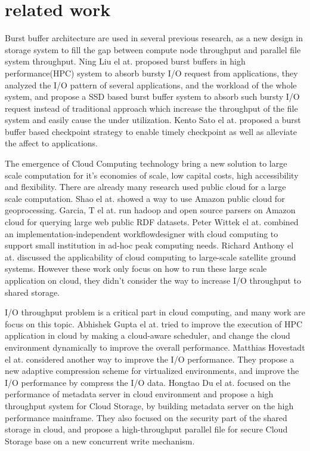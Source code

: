 \section{related work}
\label{sec:related work}

Burst buffer architecture are used in several previous research, as a new design in storage system
to fill the gap between compute node throughput and parallel file system throughput.
Ning Liu el at. \cite{on_the_role_of_burst_buffers} proposed burst buffers in high
performance(HPC) system to absorb bursty I/O request from applications, they analyzed the I/O
pattern of several applications, and the workload of the whole system, and propose a SSD based burst
buffer system to absorb such bursty I/O request instead of traditional approach which increase the
throughput of the file system and easily cause the under utilization.
Kento Sato el at.\cite{checkpointing} proposed a burst buffer based checkpoint strategy to enable
timely checkpoint as well as alleviate the affect to applications.

The emergence of Cloud Computing technology bring a new solution to large scale computation for it's
economies of scale, low capital costs, high accessibility and flexibility.
There are already many research used public cloud for a large scale computation.
Shao el at.\cite{Geoprocessing_on_the_Amazon_cloud_computing_platform} showed a way to use Amazon
public cloud for geoprocessing.
Garcia, T el at.\cite{Analysis_of_Big_Data_Technologies_and_Method} run hadoop and open source
parsers on Amazon cloud for querying large web public RDF datasets.
Peter Wittek el at.\cite{XML_Processing_in_the_Cloud} combined an implementation-independent
workflowdesigner with cloud computing to support small institution in ad-hoc peak computing needs.
Richard Anthony el at.\cite{Cloud_computing_applications_for_large-scale_satellite_ground_systems}
discussed the applicability of cloud computing to large-scale satellite ground 
systems.
However these work only focus on how to run these large scale application on cloud, they didn't
consider the way to increase I/O throughput to shared storage.

I/O throughput problem is a critical part in cloud computing, and many work are focus on this
topic.
Abhishek Gupta el at.\cite{Towards_Efficient_Mapping} tried to improve the execution of HPC
application in cloud by making a cloud-aware scheduler, and change the cloud environment
dynamically to improve the overall performance.
Matthias Hovestadt el at.\cite{Evaluating_Adaptive_Compression} considered another way to improve
the I/O performance.
They propose a new adaptive compression scheme for virtualized environments, and improve the I/O
performance by compress the I/O data.
Hongtao Du el at.\cite{DHFS:_A_High-Throughput_Heterogeneous_File_System_Based_on_Mainframe_for_Cloud_Storage}
focused on the performance of metadata server in cloud environment and propose a high throughput
system for Cloud Storage, by building metadata server on the high performance mainframe.
They also focused on the security part of the shared storage in cloud, and propose a
high-throughput parallel file for secure Cloud Storage base on a new concurrent write
mechanism\cite{PsFS:_A_high-throughput_parallel_file_system_for_secure_Cloud_Storage_system}.
